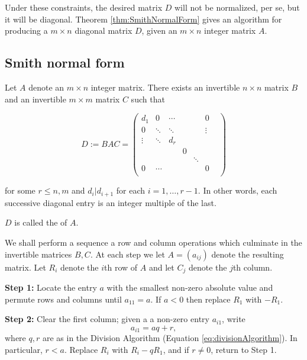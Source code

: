 \documentclass[../algebraNotesMSRI-UP2016.tex]{subfiles}
\begin{document}
\begin{frame}[c]
Under these constraints, the desired matrix $D$ will not be normalized, per se, but it will be diagonal.  Theorem \ref{thm:SmithNormalForm} gives an algorithm for producing a  %
$m\times n$ diagonal matrix $D$, given an $m\times n$ integer matrix $A$.

\smallGap
\end{frame}

\subsection[\subsecname]{Smith normal form}
\begin{frame}{\subsecname}
\begin{thm}\label{thm:SmithNormalForm}
Let $A$ denote an $m\times n$ integer matrix.  There exists an invertible $n\times n$ matrix $B$ and an invertible $m\times m$ matrix $C$ such that 

\[
D:=BAC=\begin{pmatrix}
	d_1 & 0 & \cdots & & & 0 \\
	0 & \ddots & \ddots & & & \vdots \\
	\vdots & \ddots & d_r & & & \\
	 & & & 0 & & & \\
	 & & & & \ddots &  \\
	0 & \cdots & & & & 0 \\	
	\end{pmatrix}
\]

for some $r\leq n,m$ and $d_i|d_{i+1}$ for each $i=1,\dots,r-1$.  In other words, each successive diagonal entry is an integer multiple of the last. 
%
%
\end{thm}  
\end{frame}

\begin{frame}{}{}
$D$ is called the  of $A$.

\bigProof
We shall perform a sequence a row and column operations which culminate %
in the invertible matrices $B,C$.  At each step we let $A=(a_{ij})$ denote the resulting matrix.  Let $R_i$ denote the $i$th row of $A$ and let $C_j$ denote the $j$th column.    

\smallGap
\textbf{Step 1:} Locate the entry $a$ with the smallest non-zero absolute value and permute rows and columns until $a_{11}=a$.  If $a<0$ then replace $R_1$ with $-R_1$.  

\smallGap
\textbf{Step 2:} Clear the first column; given a a non-zero entry $a_{i1}$, write 
\[
a_{i1}= aq+r,
\]  
where $q,r$ are as in the Division Algorithm (Equation \eqref{eq:divisionAlgorithm}).  In particular, $r<a$.  Replace $R_i$ with $R_i-qR_1$, and if $r\neq 0$, return to Step 1.  
\end{frame}
\end{document}
